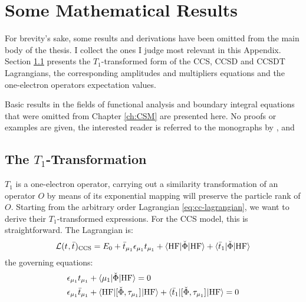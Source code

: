 \chapter{Some Mathematical Results}\label{app:mathematical-results}

\begin{epigraphs}
\end{epigraphs}

For brevity's sake, some results and derivations have been omitted from the main
body of the thesis. I collect the ones I judge most relevant in this Appendix.
Section \ref{sec:T1-cc} presents the $T_1$-transformed form of the
\acrshort{CCS}, \acrshort{CCSD} and \acrshort{CCSDT} Lagrangians, the corresponding amplitudes
and multipliers equations and the one-electron operators expectation values.

Basic results in the fields of functional analysis and boundary integral
equations that were omitted from Chapter \ref{ch:CSM} are presented here.
No proofs or examples are given, the interested reader is referred to the
monographs by \citeauthor{Ern2004-oo}, \citeauthor{Hsiao2008-xb} and
\citeauthor{Sauter2011-an}\autocite{Ern2004-oo, Hsiao2008-xb, Sauter2011-an}

\section{The \texorpdfstring{$T_1$}{T1}-Transformation}\label{sec:T1-cc}

$T_1$ is a one-electron operator, carrying out a similarity transformation of
an operator $O$ by means of its exponential mapping will preserve the particle
rank of $O$.\autocite{Koch1994-vr}
Starting from the arbitrary order Lagrangian \eqref{eq:cc-lagrangian},
we want to derive their $T_1$-transformed
expressions.
For the \acrshort{CCS} model, this is straightforward.
The Lagrangian is:
\begin{equation}\label{eq:ccs-lagrangian}
 \mathcal{L}(t_{}, \bar{t}_{})_\mathrm{CCS}
 =
  E_0
  + \bar{t}_{\mu_1}\epsilon_{\mu_1}t_{\mu_1}
  + \braket{\mathrm{HF} | \check{\Phi} | \mathrm{HF}}
  + \braket{\bar{t}_{1} | \check{\Phi} | \mathrm{HF}}
\end{equation}
the governing equations:
\begin{subequations}\label{eq:ccs-equations}
  \begin{align}
   \epsilon_{\mu_1}t_{\mu_1} &+ \braket{\mu_1 | \check{\Phi} | \mathrm{HF}}
             = 0 \label{eq:ccs-amplitudes}\\
    \epsilon_{\mu_1}\bar{t}_{\mu_1} &+
    \braket{\mathrm{HF} | [ \check{\Phi}, \tau_{\mu_1} ]^{} | \mathrm{HF}} +
    \braket{\bar{t}_{1} |
    [ \check{\Phi}, \tau_{\mu_1} ]^{} | \mathrm{HF}}
             = 0 \label{eq:ccs-multipliers}
  \end{align}
\end{subequations}

